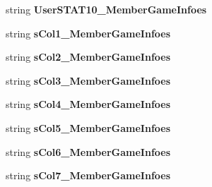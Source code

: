 \begin{DoxyCompactItemize}
\item 
string {\bfseries User\+S\+T\+A\+T10\+\_\+\+Member\+Game\+Infoes}\hypertarget{a00111_a34a51ba47f0396e3879f3b80b16ccce5}{}\label{a00111_a34a51ba47f0396e3879f3b80b16ccce5}

\item 
string {\bfseries s\+Col1\+\_\+\+Member\+Game\+Infoes}\hypertarget{a00111_a82c25aaa430b0c7876b2de6ba52546f0}{}\label{a00111_a82c25aaa430b0c7876b2de6ba52546f0}

\item 
string {\bfseries s\+Col2\+\_\+\+Member\+Game\+Infoes}\hypertarget{a00111_aa1ac923683314a3c22aa69de9f0e1cee}{}\label{a00111_aa1ac923683314a3c22aa69de9f0e1cee}

\item 
string {\bfseries s\+Col3\+\_\+\+Member\+Game\+Infoes}\hypertarget{a00111_a0ac24ac4c9f1b292f6a177c8db3620fe}{}\label{a00111_a0ac24ac4c9f1b292f6a177c8db3620fe}

\item 
string {\bfseries s\+Col4\+\_\+\+Member\+Game\+Infoes}\hypertarget{a00111_a0ff61ea38bb20777d3cdfe1a098d2491}{}\label{a00111_a0ff61ea38bb20777d3cdfe1a098d2491}

\item 
string {\bfseries s\+Col5\+\_\+\+Member\+Game\+Infoes}\hypertarget{a00111_a6c5e1c44f7f51bd3c2e8dba1151f593d}{}\label{a00111_a6c5e1c44f7f51bd3c2e8dba1151f593d}

\item 
string {\bfseries s\+Col6\+\_\+\+Member\+Game\+Infoes}\hypertarget{a00111_a2d02061280d32b16d0243507d660adac}{}\label{a00111_a2d02061280d32b16d0243507d660adac}

\item 
string {\bfseries s\+Col7\+\_\+\+Member\+Game\+Infoes}\hypertarget{a00111_a88f6683e79408a63e96883a5b9dc62df}{}\label{a00111_a88f6683e79408a63e96883a5b9dc62df}


\end{DoxyCompactItemize}
